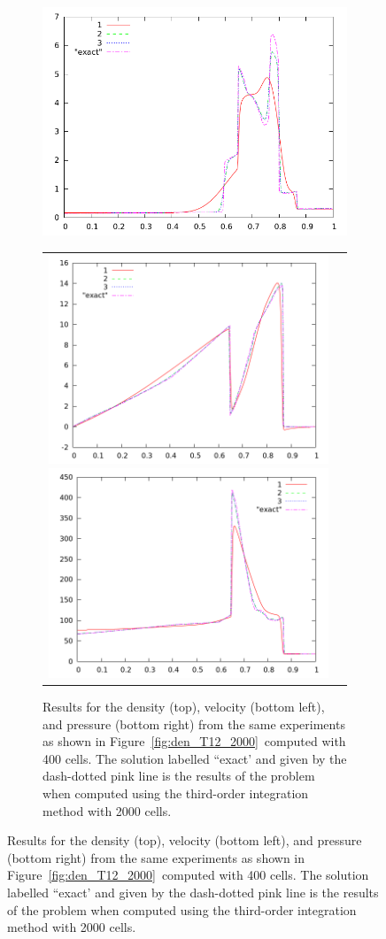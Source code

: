 \documentclass[10pt]{article}
\begin{document}
\begin{figure}[h]
\begin{figure}[h]
  \begin{center}
     \includegraphics[width=.95\textwidth]{den_T12_400.png}	
	\begin{tabular}{cc}
     \includegraphics[width=.475\textwidth]{vel_T12_400.png}
     \includegraphics[width=.475\textwidth]{prs_T12_400.png}	
    \end{tabular}
  \end{center}
  \caption{Results for the density (top), velocity (bottom left), and pressure (bottom right) from the same experiments as shown in Figure~\ref{fig:den_T12_2000}~computed with 400 cells. The solution labelled ``exact' and given by the dash-dotted pink line is the results of the problem when computed using the third-order integration method with 2000 cells.}
  \label{fig:den_T12_400}
\end{figure}



\end{figure}
\end{document}
